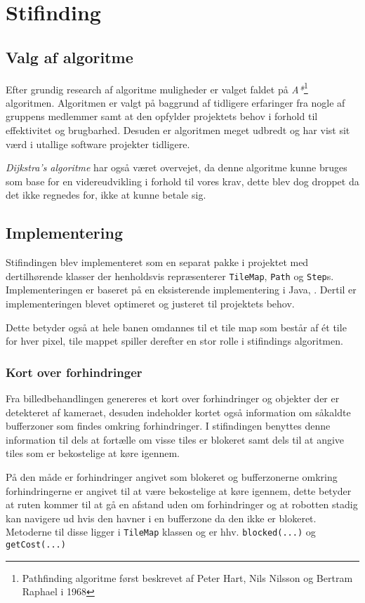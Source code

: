 \chapter{Stifinding}

\section{Valg af algoritme}
Efter grundig research af algoritme muligheder er valget faldet på \textit{A*}\footnote{Pathfinding algoritme først beskrevet af  Peter Hart, Nils Nilsson og Bertram Raphael i 1968} algoritmen.
Algoritmen er valgt på baggrund af tidligere erfaringer fra nogle af gruppens medlemmer samt at den opfylder projektets behov i forhold til effektivitet og brugbarhed. Desuden er algoritmen meget udbredt og har vist sit værd i utallige software projekter tidligere.

\textit{Dijkstra's algoritme} har også været overvejet, da denne algoritme kunne bruges som base for en videreudvikling i forhold til vores krav, dette blev dog droppet da det ikke regnedes for, ikke at kunne betale sig.

\section{Implementering}
Stifindingen blev implementeret som en separat pakke i projektet med dertilhørende klasser der henholdsvis repræsenterer \texttt{TileMap}, \texttt{Path} og \texttt{Step}s. Implementeringen er baseret på en eksisterende implementering i Java, \citet{astar}.
Dertil er implementeringen blevet optimeret og justeret til projektets behov.

Dette betyder også at hele banen omdannes til et tile map som består af ét tile for hver pixel, tile mappet spiller derefter en stor rolle i stifindings algoritmen.

\subsection{Kort over forhindringer}
Fra billedbehandlingen genereres et kort over forhindringer og objekter der er detekteret af kameraet, desuden indeholder kortet også information om såkaldte bufferzoner som findes omkring forhindringer. I stifindingen benyttes denne information til dels at fortælle om visse tiles er blokeret samt dels til at angive tiles som er bekostelige at køre igennem.

På den måde er forhindringer angivet som blokeret og bufferzonerne omkring forhindringerne er angivet til at være bekostelige at køre igennem, dette betyder at ruten kommer til at gå en afstand uden om forhindringer og at robotten stadig kan navigere ud hvis den havner i en bufferzone da den ikke er blokeret. Metoderne til disse ligger i \texttt{TileMap} klassen og er hhv. \texttt{blocked(...)} og \texttt{getCost(...)}


